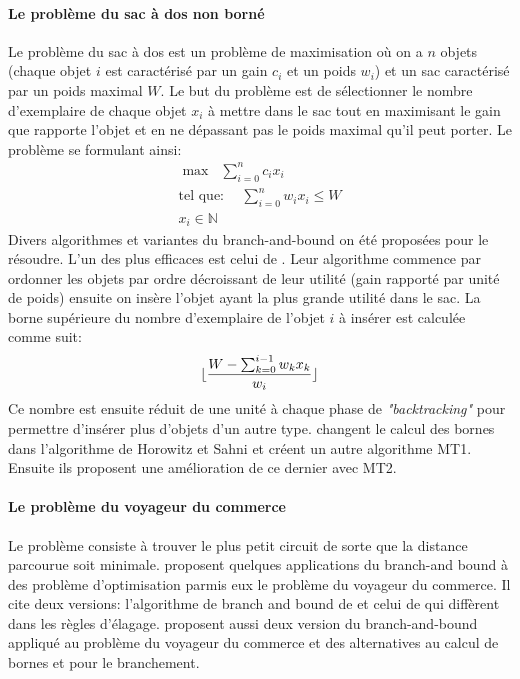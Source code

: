 \documentclass[12pt,a4paper,oneside]{book}
\theoremstyle{definition}
\newcommand{\N}{\mathbb{N}}
\DeclarePairedDelimiter\floor{\lfloor}{\rfloor}
\begin{document}
	\paragraph{Le  problème du sac à dos non borné}
	Le problème du sac à dos est un problème de maximisation où on a $n$ objets (chaque objet $i$ est caractérisé par un gain $c_i$ et un poids $w_i$) et un sac caractérisé par un poids maximal $W$. Le but du problème est de sélectionner le nombre d'exemplaire de chaque objet $x_i$ à mettre dans le sac tout en maximisant le gain que rapporte l'objet et en ne dépassant pas le poids maximal qu'il peut porter. Le problème se formulant ainsi:
	\begin{gather}
	    \max \hspace{7pt} \sum_{i=0}^{n} c_i x_i \\
	    \text{tel que:} \hspace{15pt}
	    \sum_{i=0}^{n} w_i x_i \leq W \\
	    x_i \in \N
	\end{gather}
	Divers algorithmes et variantes du branch-and-bound on été proposées pour le résoudre. L'un des plus efficaces est celui de \cite{horowitz1974computing}. Leur algorithme commence par ordonner les objets par ordre décroissant de leur utilité (gain rapporté par unité de poids) ensuite on insère l'objet ayant la plus grande utilité dans le sac. La borne supérieure du nombre d'exemplaire de l'objet $i$ à insérer est calculée comme suit: 
	\begin{gather}
	    \floor{\frac{W-\sum_{k=0}^{i-1}w_k x_k}{w_i}}    
	\end{gather}
	Ce nombre est ensuite réduit de une unité à chaque phase de \textit{"backtracking"} pour permettre d'insérer plus d'objets d'un autre type. \cite{martello1987algorithms} changent le calcul des bornes dans l'algorithme de Horowitz et Sahni et créent un autre algorithme MT1. Ensuite ils proposent une amélioration de ce dernier avec MT2.
	
	\paragraph{Le problème du voyageur du commerce}
	 Le problème consiste à trouver le plus petit circuit de sorte que la distance parcourue soit minimale. \cite{Lawler1966BranchandBoundMA} proposent quelques applications du branch-and bound à des problème d'optimisation parmis eux le problème du voyageur du commerce. Il cite deux versions: l'algorithme de branch and bound de \cite{eastman1958linear} et celui de \cite{little1963algorithm} qui diffèrent dans les règles d'élagage. \cite{balas1983branch} proposent aussi deux version du branch-and-bound appliqué au problème du voyageur du commerce et des alternatives au calcul de bornes et pour le branchement.
	
\end{document}
